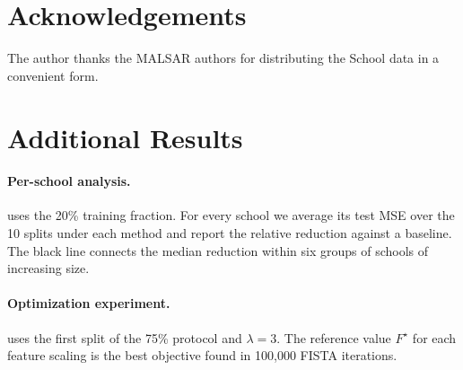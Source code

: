 \section*{Acknowledgements}
The author thanks the MALSAR authors for distributing the School data in a convenient form.




\clearpage
\appendix
\section{Additional Results}
\label{app:extra}




\paragraph{Per-school analysis.}
 uses the 20\% training fraction. For every school we average its test MSE over the 10 splits under each method and report the relative reduction against a baseline. The black line connects the median reduction within six groups of schools of increasing size.

\paragraph{Optimization experiment.}
 uses the first split of the 75\% protocol and $\lambda = 3$. The reference value $F^\star$ for each feature scaling is the best objective found in 100,000 FISTA iterations.

